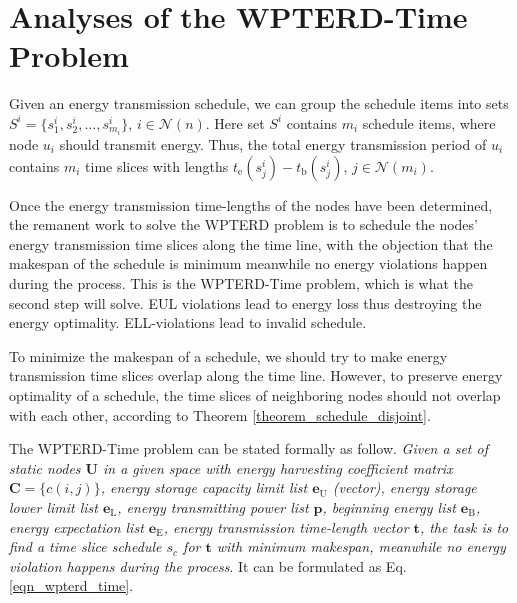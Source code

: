 \documentclass[12pt,journal,onecolumn,draftcls]{IEEEtran}
\begin{document}
\section{Analyses of the WPTERD-Time Problem}
\label{sec_wpter_time}
Given an energy transmission schedule, we can group the schedule items into sets $S^{i}{=}\{s^{i}_1, s^{i}_2, \ldots, s^{i}_{m_i}\}$, $i{\in}\mathcal{N}(n)$. Here set $S^{i}$ contains $m_i$ schedule items, where node $u_i$ should transmit energy. Thus, the total energy transmission period of $u_i$ contains $m_i$ time slices with lengths $t_\text{e}(s^{i}_j){-}t_\text{b}(s^{i}_j)$, $j{\in}\mathcal{N}(m_i)$.

Once the energy transmission time-lengths of the nodes have been determined, the remanent work to solve the WPTERD problem is to schedule the nodes' energy transmission time slices along the time line, with the objection that the makespan of the schedule is minimum meanwhile no energy violations happen during the process. This is the WPTERD-Time problem, which is what the second step will solve. EUL violations lead to energy loss thus destroying the energy optimality. ELL-violations lead to invalid schedule.

To minimize the makespan of a schedule, we should try to make energy transmission time slices overlap along the time line. However, to preserve energy optimality of a schedule, the time slices of neighboring nodes should not overlap with each other, according to Theorem \ref{theorem_schedule_disjoint}.

The WPTERD-Time problem can be stated formally as follow. \textit{Given a set of static nodes $\textbf{U}$ in a given space with energy harvesting coefficient matrix $\mathbf{C}{=}\{c(i,j)\}$, energy storage capacity limit list $\textbf{e}_\text{U}$ (vector), energy storage lower limit list $\textbf{e}_\text{L}$, energy transmitting power list $\textbf{p}$, beginning energy list $\textbf{e}_\text{B}$, energy expectation list $\textbf{e}_\text{E}$, energy transmission time-length vector $\textbf{t}$, the task is to find a time slice schedule $s_c$ for $\textbf{t}$ with minimum makespan, meanwhile no energy violation happens during the process}. It can be formulated as Eq.\eqref{eqn_wpterd_time}.
\end{document}
